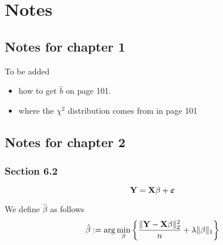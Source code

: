 \chapter{Notes}

\section{Notes for chapter 1}
To be added
\begin{itemize}
    \item how to get $\hat b$ on page 101.
    \item where the $\chi^2$ distribution comes from in page 101
\end{itemize}

\section{Notes for chapter 2}
\subsection{Section 6.2}
\begin{equation}
    \label{def: linear model (matrix)}
    \mathbf{Y} = \mathbf{X} \beta + \boldsymbol{\varepsilon}
\end{equation}

We define $\hat \beta$ as follows
\begin{equation}
    \label{not: beta hat}
    \hat{\beta}:=\arg \min _{\beta}\left\{\frac{\|\mathbf{Y}-\mathbf{X} \beta\|_{2}^{2}}{n}+\lambda\|\beta\|_{1}\right\}
\end{equation}

